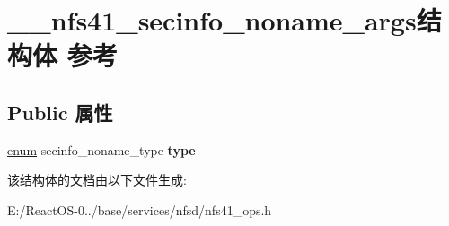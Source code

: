 \hypertarget{struct____nfs41__secinfo__noname__args}{}\section{\+\_\+\+\_\+nfs41\+\_\+secinfo\+\_\+noname\+\_\+args结构体 参考}
\label{struct____nfs41__secinfo__noname__args}
\subsection*{Public 属性}
\begin{DoxyCompactItemize}
\item 
\mbox{\label{struct____nfs41__secinfo__noname__args_ad45d2fe741be4216a2fc89d62b968f7a}} 
\hyperlink{interfaceenum}{enum} secinfo\+\_\+noname\+\_\+type {\bfseries type}
\end{DoxyCompactItemize}


该结构体的文档由以下文件生成\+:\begin{DoxyCompactItemize}
\item 
E\+:/\+React\+O\+S-\/0../base/services/nfsd/nfs41\+\_\+ops.\+h\end{DoxyCompactItemize}
